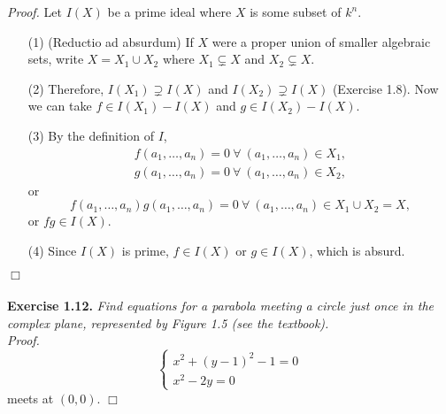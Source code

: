 \documentclass{article}
\begin{document}
\emph{Proof.}
Let $I(X)$ be a prime ideal where $X$ is some subset of $k^n$.
\begin{enumerate}
  \item[(1)]
  (Reductio ad absurdum)
  If $X$ were a proper union of smaller algebraic sets, write $X = X_1 \cup X_2$
  where $X_1 \subsetneq X$ and $X_2 \subsetneq X$.
  \item[(2)]
  Therefore, $I(X_1) \supsetneq I(X)$ and $I(X_2) \supsetneq I(X)$ (Exercise 1.8).
  Now we can take $f \in I(X_1)-I(X)$ and $g \in I(X_2)-I(X)$.
  \item[(3)]
  By the definition of $I$,
  \begin{align*}
    f(a_1,\ldots,a_n) = 0 \: \forall \: (a_1, \ldots, a_n) \in X_1, \\
    g(a_1,\ldots,a_n) = 0 \: \forall \: (a_1, \ldots, a_n) \in X_2,
  \end{align*}
  or
  \[
    f(a_1, \ldots, a_n)
    g(a_1, \ldots, a_n) = 0 \: \forall \: (a_1, \ldots, a_n) \in X_1 \cup X_2 = X,
  \]
  or $fg \in I(X)$.
  \item[(4)]
  Since $I(X)$ is prime, $f \in I(X)$ or $g \in I(X)$,
  which is absurd.
\end{enumerate}
$\Box$ \\\\






\textbf{Exercise 1.12.}
\emph{Find equations for a parabola meeting a circle just once
in the complex plane, represented by Figure 1.5 (see the textbook).} \\

\emph{Proof.}
\begin{equation*}
  \begin{cases}
    x^2 + (y-1)^2 - 1 = 0 \\
    x^2 - 2y = 0
  \end{cases}
\end{equation*}
meets at $(0,0)$.
$\Box$ \\\\



\end{document}
